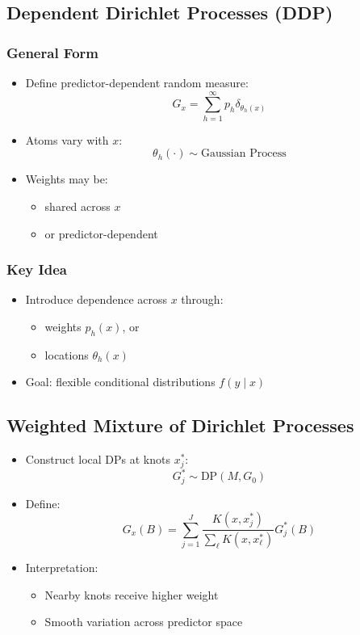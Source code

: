 \documentclass[12pt,oneside]{book}
\numberwithin{equation}{section}
\theoremstyle{definition}
\theoremstyle{plain}
\theoremstyle{remark}
\begin{document}
\subsection{Dependent Dirichlet Processes (DDP)}

\subsubsection*{General Form}
\begin{itemize}
\item Define predictor-dependent random measure:
\[
G_x = \sum_{h=1}^\infty p_h \delta_{\theta_h(x)}
\]
\item Atoms vary with $x$:
\[
\theta_h(\cdot) \sim \text{Gaussian Process}
\]
\item Weights may be:
\begin{itemize}
\item shared across $x$
\item or predictor-dependent
\end{itemize}
\end{itemize}

\subsubsection*{Key Idea}
\begin{itemize}
\item Introduce dependence across $x$ through:
\begin{itemize}
\item weights $p_h(x)$, or
\item locations $\theta_h(x)$
\end{itemize}
\item Goal: flexible conditional distributions $f(y \mid x)$
\end{itemize}

\subsection{Weighted Mixture of Dirichlet Processes}

\begin{itemize}
\item Construct local DPs at knots $x_j^*$:
\[
G_j^* \sim \mathrm{DP}(M, G_0)
\]
\item Define:
\[
G_x(B) = \sum_{j=1}^J \frac{K(x, x_j^*)}{\sum_\ell K(x, x_\ell^*)} G_j^*(B)
\]
\item Interpretation:
\begin{itemize}
\item Nearby knots receive higher weight
\item Smooth variation across predictor space
\end{itemize}
\end{itemize}
\end{document}
